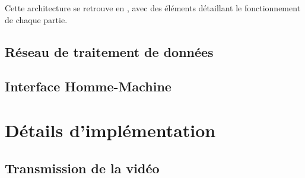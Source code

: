 			Cette architecture se retrouve en \todoref, avec des éléments détaillant le fonctionnement de chaque partie.

		\subsection{Réseau de traitement de données}

			
		\subsection{Interface Homme-Machine}
		

	\section{Détails d'implémentation}
	
		\subsection{Transmission de la vidéo}
		
